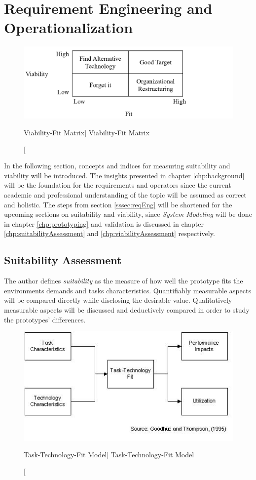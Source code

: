 \section{Requirement Engineering and Operationalization}\label{sec:operationalization}

\begin{figure}[ht]
    \includegraphics[width=\linewidth]{images/methodology/viabFit.PNG}\centering
    \caption
    [Viability-Fit Matrix]
    {Viability-Fit Matrix \cite{Liang2004IntroductionApplications}}
\end{figure}

In the following section, concepts and indices for measuring suitability and viability will be introduced. The insights presented in chapter \ref{chp:background} will be the foundation for the requirements and operators since the current academic and professional understanding of the topic will be assumed as correct and holistic. The steps from section \ref{sssec:reqEng} will be shortened for the upcoming sections on suitability and viability, since \textit{System Modeling} will be done in chapter \ref{chp:prototyping} and validation is discussed in chapter \ref{chp:suitabilityAssessment} and \ref{chp:viabilityAssessment} respectively.  

\subsection{Suitability Assessment}

The author defines \textit{suitability} as the measure of how well the prototype fits the environments demands and tasks characteristics. Quantifiably measurable aspects will be compared directly while disclosing the desirable value. Qualitatively measurable aspects will be discussed and deductively compared in order to study the prototypes' differences. 

\begin{figure}[ht]
    \includegraphics[width=0.7\linewidth]{images/methodology/ttf.jpg}\centering
    \caption
    [Task-Technology-Fit Model]
    {Task-Technology-Fit Model \cite{Goodhue1995Task-TechnologyPerformance}}
\end{figure}

